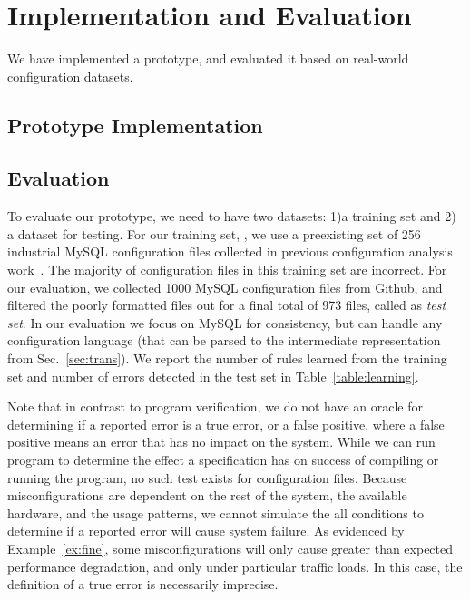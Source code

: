 
\section{Implementation and Evaluation}

We have implemented a \app prototype, and evaluated it based on
real-world configuration datasets.

\subsection{Prototype Implementation}


\subsection{Evaluation}

To evaluate our \app prototype, we need to have two datasets:
1)a training set and 2) a dataset for testing. 
For our training set, \trainingSet, we use a preexisting set of 256 
industrial MySQL configuration files collected in previous configuration 
analysis work~\cite{configdataset}.
The majority of configuration files in this training set are incorrect.
For our evaluation, we collected 1000 MySQL configuration files 
from Github, and filtered the poorly formatted files out for a final 
total of 973 files, called as {\em test set}.
In our evaluation we focus on MySQL for consistency, 
but \app can handle any configuration language (that can be parsed to 
the intermediate representation from Sec.~\ref{sec:trans}).
We report the number of rules learned from the training set and number of errors detected in the test set in Table~\ref{table:learning}.

Note that in contrast to program verification, we do not have an oracle for determining if a reported error is a true error, or a false positive, where a false positive means an error that has no impact on the system.
While we can run program to determine the effect a specification has on success of compiling or running the program, no such test exists for configuration files.
Because misconfigurations are dependent on the rest of the system, the available hardware, and the usage patterns, we cannot simulate the all conditions to determine if a reported error will cause system failure.
As evidenced by Example~\ref{ex:fine}, some misconfigurations will only cause greater than expected performance degradation, and only under particular traffic loads.
In this case, the definition of a true error is necessarily imprecise.

